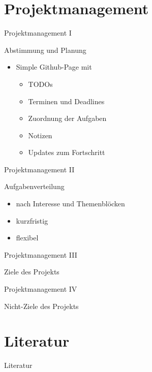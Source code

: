 \documentclass[presentation,bigger,aspectratio=169]{beamer}
\begin{document}
\section{Projektmanagement}
\label{sec:org15d2bc2}
\begin{frame}[label={sec:orgdc3238f}]{\vspace{2.2cm}\begin{center}\MakeUppercase{\insertsection}\end{center}}
\end{frame}

\begin{frame}[label={sec:org663486f}]{Projektmanagement I}
\begin{block}{Abstimmung und Planung}
\begin{itemize}
\item Simple Github-Page mit
\begin{itemize}
\item TODOs
\item Terminen und Deadlines
\item Zuordnung der Aufgaben
\item Notizen
\item Updates zum Fortschritt
\end{itemize}
\end{itemize}
\end{block}
\end{frame}

\begin{frame}[label={sec:org999aaec}]{Projektmanagement II}
\begin{block}{Aufgabenverteilung}
\begin{itemize}
\item nach Interesse und Themenblöcken
\item kurzfristig
\item flexibel
\end{itemize}
\end{block}
\end{frame}
\begin{frame}[label={sec:org38ba874}]{Projektmanagement III}
\begin{block}{Ziele des Projekts}
\end{block}
\end{frame}
\begin{frame}[label={sec:orge874eb9}]{Projektmanagement IV}
\begin{block}{Nicht-Ziele des Projekts}
\end{block}
\end{frame}
\section*{Literatur}
\label{sec:orgdcdd548}
\begin{frame}[allowframebreaks]{Literatur}
\printbibliography[heading=none]
\end{frame}
\appendix
\end{document}
